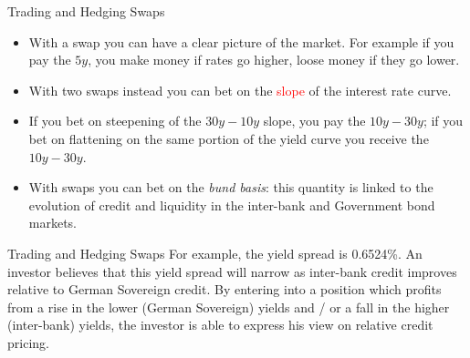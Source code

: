 \documentclass{beamer}
\begin{document}

\begin{frame}{Trading and Hedging Swaps}
	\begin{itemize}
		\item With a swap you can have a clear picture of the market. For example if you pay the $5y$, you make money if rates go higher, loose money if they go lower.
		\item With two swaps instead you can bet on the \textcolor{red}{slope} of the interest rate curve.
		\item If you bet on steepening of the $30y-10y$ slope, you pay the $10y-30y$; if you bet on flattening on the same portion of the yield curve you receive the $10y-30y$.		
		\item With swaps you can bet on the \emph{bund basis}: this quantity is linked to the evolution of credit and liquidity in the inter-bank and Government bond markets.
	\end{itemize}
\end{frame}

\begin{frame}{Trading and Hedging Swaps}
	For example, the yield spread is 0.6524\%. An investor believes that this yield spread will narrow as inter-bank credit improves relative to German Sovereign credit. By entering into a position which profits from a rise in the lower (German	Sovereign) yields and / or a fall in the higher (inter-bank) yields, the investor is able to express his view on relative credit pricing.
\end{frame}
\end{document}
